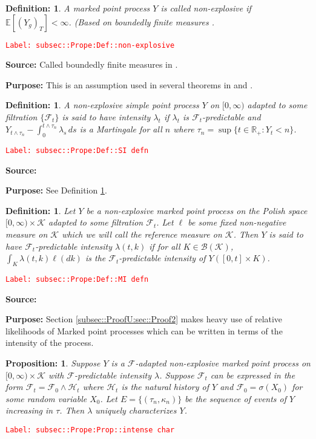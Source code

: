 \documentclass[12pt]{article}
\newcommand{\mb}{\mathbb}
\newcommand{\mc}{\mathcal}
\newcommand{\ms}{\mathscr}
\newcommand{\tr}{\textcolor{red}}
\newcommand{\labe}[1]{\tr{\texttt{Label: #1}}}
\newcommand{\purpose}{\textbf{Purpose: }}
\newcommand{\ex}[1]{\mb{E}\left[#1\right]}			%
\newtheorem{prop}[thms]{Proposition: }
\newtheorem{defn}[thms]{Definition: }
\begin{document}
\begin{defn}
A marked point process \(Y\) is called non-explosive if \(\ex{(Y_g)_T} < \infty\). (Based on boundedly finite measures \cite[Definition 9.1.I]{DalVer08}.
\label{subsec::Prope:Def::non-explosive}
\end{defn}
\labe{subsec::Prope:Def::non-explosive}

\textbf{Source: } Called boundedly finite measures in \cite[Definition 9.1.I]{DalVer08}.

\purpose This is an assumption used in several theorems in \cite{DalVer03} and \cite{DalVer08}.

\begin{defn}
A non-explosive simple point process \(Y\) on \([0,\infty)\) adapted to some filtration \(\{\mc{F}_t\}\) is said to have intensity \(\lambda_t\) if \(\lambda_t\) is \(\mc{F}_t\)-predictable and \(Y_{t\wedge \tau_n} - \int_0^{t\wedge \tau_n} \lambda_s\,ds\) is a Martingale for all \(n\) where \(\tau_n = \sup\{t \in \mb{R}_+: Y_t < n\}\). 
\label{subsec::Prope:Def::SI defn}
\end{defn}
\labe{subsec::Prope:Def::SI defn}

\textbf{Source: } \cite[Definitions 14.3.I,14.1.I]{DalVer08}

\purpose See Definition \ref{subsec::Prope:Def::MI defn}.

\begin{defn}
Let \(Y\) be a non-explosive marked point process on the Polish space \([0,\infty)\times \mc{K}\) adapted to some filtration \(\mc{F}_t\). Let \(\ell\) be some fixed non-negative measure on \(\mc{K}\) which we will call the reference measure on \(\mc{K}\). Then \(Y\) is said to have \(\mc{F}_t\)-predictable intensity \(\lambda(t,k)\) if for all \(K \in \ms{B}(\mc{K})\), \(\int_K \lambda(t,k)\ell(dk)\) is the \(\mc{F}_t\)-predictable intensity of \(Y([0,t]\times K)\). 
\label{subsec::Prope:Def::MI defn}
\end{defn}
\labe{subsec::Prope:Def::MI defn}

\textbf{Source: }\cite[Definition 14.3.I]{DalVer08}

\purpose Section \ref{subsec::ProofU:sec::Proof2} makes heavy use of relative likelihoods of Marked point processes which can be written in terms of the intensity of the process.

\begin{prop}
Suppose \(Y\) is a \(\mc{F}\)-adapted non-explosive marked point process on \([0,\infty)\times \mc{K}\) with \(\mc{F}\)-predictable intensity \(\lambda\). Suppose \(\mc{F}_t\) can be expressed in the form \(\mc{F}_t = \mc{F}_0\wedge \mc{H}_t\) where \(\mc{H}_t\) is the natural history of \(Y\) and \(\mc{F}_0 = \sigma(X_0)\) for some random variable \(X_0\). Let \(E = \{(\tau_n,\kappa_n)\}\) be the sequence of events of \(Y\) increasing in \(\tau\). Then \(\lambda\) uniquely characterizes \(Y\).
\label{subsec::Prope:Prop::intense char}
\end{prop}
\labe{subsec::Prope:Prop::intense char}
\end{document}

